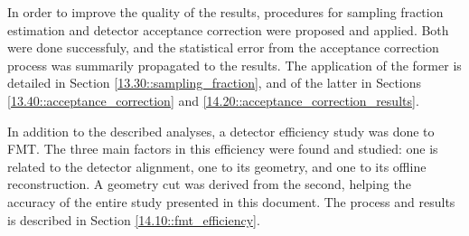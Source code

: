     In order to improve the quality of the results, procedures for sampling fraction estimation and detector acceptance correction were proposed and applied.
    Both were done successfuly, and the statistical error from the acceptance correction process was summarily propagated to the results.
    The application of the former is detailed in Section \ref{13.30::sampling_fraction}, and of the latter in Sections \ref{13.40::acceptance_correction} and \ref{14.20::acceptance_correction_results}.

    In addition to the described analyses, a detector efficiency study was done to FMT.
    The three main factors in this efficiency were found and studied: one is related to the detector alignment, one to its geometry, and one to its offline reconstruction.
    A geometry cut was derived from the second, helping the accuracy of the entire study presented in this document.
    The process and results is described in Section \ref{14.10::fmt_efficiency}.
